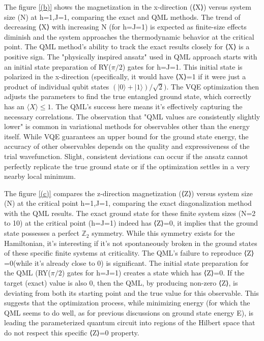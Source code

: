 \documentclass[a4paper]{article}
\begin{document}
The figure \ref{(b)} shows the magnetization in the x-direction (⟨X⟩) versus system size (N) at h=1,J=1, comparing the exact and QML methods. The trend of decreasing ⟨X⟩ with increasing N (for h=J=1) is expected as finite-size effects diminish and the system approaches the thermodynamic behavior at the critical point. The QML method's ability to track the exact results closely for ⟨X⟩ is a positive sign. The "physically inspired ansatz" used in QML approach starts with an initial state preparation of RY($\pi/2$) gates for h=J=1. This initial state is polarized in the x-direction (specifically, it would have ⟨X⟩=1 if it were just a product of individual qubit states $(|0⟩+|1⟩)/\sqrt2)$. The VQE optimization then adjusts the parameters to find the true entangled ground state, which correctly has an $⟨X⟩\leq1$. The QML's success here means it's effectively capturing the necessary correlations. The observation that "QML values are consistently slightly lower" is common in variational methods for observables other than the energy itself. While VQE guarantees an upper bound for the ground state energy, the accuracy of other observables depends on the quality and expressiveness of the trial wavefunction. Slight, consistent deviations can occur if the ansatz cannot perfectly replicate the true ground state or if the optimization settles in a very nearby local minimum.

The figure \ref{(c)} compares the z-direction magnetization (⟨Z⟩) versus system size (N) at the critical point h=1,J=1, comparing the exact diagonalization method with the QML results. The exact ground state for these finite system sizes (N=2 to 10) at the critical point (h=J=1) indeed has ⟨Z⟩=0, it implies that the ground state possesses a perfect $\mathbb{Z}_2$ symmetry. While this symmetry exists for the Hamiltonian, it's interesting if it's not spontaneously broken in the ground states of these specific finite systems at criticality. The QML's failure to reproduce ⟨Z⟩=0(while it's already close to 0) is significant. The initial state preparation for the QML (RY($\pi/2$) gates for h=J=1) creates a state which has ⟨Z⟩=0. If the target (exact) value is also 0, then the QML, by producing non-zero ⟨Z⟩, is deviating from both its starting point and the true value for this observable. This suggests that the optimization process, while minimizing energy (for which the QML seems to do well, as for previous discussions on ground state energy E), is leading the parameterized quantum circuit into regions of the Hilbert space that do not respect this specific ⟨Z⟩=0 property.
\end{document}
